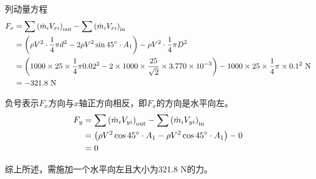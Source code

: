 \begin{example}
	列动量方程
	\begin{align*}
		F_x &= \sum \qty(\dot{m}_i V_{xi})_{\mathrm{out}} - \sum \qty(\dot{m}_i V_{xi})_{\mathrm{in}} \\
		&= \qty(\rho V^2 \cdot \dfrac{1}{4} \pi d^2 - 2 \rho V^2 \sin 45^{\circ} \cdot A_1) - \rho V^2 \cdot \dfrac{1}{4} \pi D^2 \\
		&= \qty(1000 \times 25 \times \dfrac{1}{4} \pi 0.02^2 - 2 \times 1000 \times \dfrac{25}{\sqrt{2}} \times 3.770 \times 10^{-3}) - 1000 \times 25 \times \dfrac{1}{4} \pi \times 0.1^2 \mathrm{~N} \\
		&= -321.8 \mathrm{~N}
	\end{align*}
	
	负号表示$F_x$方向与$x$轴正方向相反，即$F_x$的方向是水平向左。
	\begin{align*}
		F_y &= \sum \qty(\dot{m}_i V_{yi})_{\mathrm{out}} - \sum \qty(\dot{m}_i V_{yi})_{\mathrm{in}} \\
		&= \qty(\rho V^2 \cos 45^{\circ} \cdot A_1 - \rho V^2 \cos 45^{\circ} \cdot A_1) - 0 \\
		&= 0
	\end{align*}
	
	综上所述，需施加一个水平向左且大小为321.8 N的力。
\end{example}

